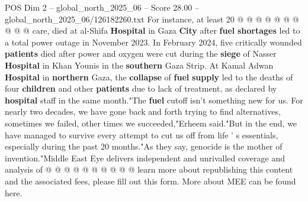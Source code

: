 \begin{textsample}{POS Dim 2 – global\_north\_2025\_06 – Score 28.00 – global\_north\_2025\_06/126182260.txt}
For instance, at least 20 @ @ @ @ @ @ @ @ @ @ care, died at al-Shifa \textbf{Hospital} in Gaza \textbf{City} after \textbf{fuel} \textbf{shortages} led to a total power outage in November 2023.
In February 2024, five critically wounded \textbf{patients} died after power and oxygen were cut during the \textbf{siege} of Nasser \textbf{Hospital} in Khan Younis in the \textbf{southern} Gaza Strip.
At Kamal Adwan \textbf{Hospital} in \textbf{northern} Gaza, the \textbf{collapse} of \textbf{fuel} \textbf{supply} led to the deaths of four \textbf{children} and other \textbf{patients} due to lack of treatment, as declared by \textbf{hospital} staff in the same month."The \textbf{fuel} cutoff isn't something new for us.
For nearly two decades, we have gone back and forth trying to find alternatives, sometimes we failed, other times we succeeded,"Erheem said."But in the end, we have managed to survive every attempt to cut us off from life ' s essentials, especially during the past 20 months."As they say, genocide is the mother of invention."Middle East Eye delivers independent and unrivalled coverage and analysis of @ @ @ @ @ @ @ @ @ @ learn more about republishing this content and the associated fees, please fill out this form.
More about MEE can be found here.

\end{textsample}
